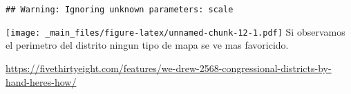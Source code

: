 \documentclass[
]{book}
\begin{document}
\begin{verbatim}
## Warning: Ignoring unknown parameters: scale
\end{verbatim}

\texttt{[image: \_main\_files/figure-latex/unnamed-chunk-12-1.pdf]}
Si observamos el perimetro del distrito ningun tipo de mapa se ve mas favoricido.

\url{https://fivethirtyeight.com/features/we-drew-2568-congressional-districts-by-hand-heres-how/}

  
\end{document}
